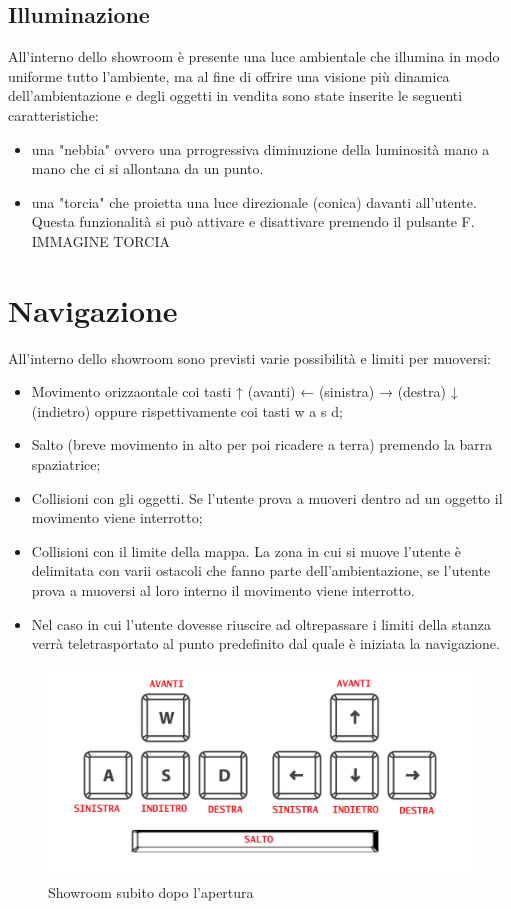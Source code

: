 \subsection{Illuminazione}
All'interno dello showroom è presente una luce ambientale che illumina in modo uniforme tutto l'ambiente, ma al fine di offrire una visione più dinamica dell'ambientazione e degli oggetti in vendita sono state inserite le seguenti caratteristiche:
\begin{itemize}
	\item una "nebbia" ovvero una prrogressiva diminuzione della luminosità mano a mano che ci si allontana da un punto.
	\item una "torcia" che proietta una luce direzionale (conica) davanti all'utente. Questa funzionalità si può attivare e disattivare premendo il pulsante F.
IMMAGINE TORCIA
\end{itemize}


\section{Navigazione}
All'interno dello showroom sono previsti varie possibilità e limiti per muoversi:
\begin{itemize}
	\item Movimento orizzaontale coi tasti ↑ (avanti) ← (sinistra) → (destra) ↓ (indietro) oppure rispettivamente coi tasti w a s d;
	\item Salto (breve movimento in alto per poi ricadere a terra) premendo la barra spaziatrice;
	\item Collisioni con gli oggetti. Se l'utente prova a muoveri dentro ad un oggetto il movimento viene interrotto;
	\item Collisioni con il limite della mappa. La zona in cui si muove l'utente è delimitata con varii ostacoli che fanno parte dell'ambientazione, se l'utente prova a muoversi al loro interno il movimento viene interrotto. 
	\item Nel caso in cui l'utente dovesse riuscire ad oltrepassare i limiti della stanza verrà teletrasportato al punto predefinito dal quale è iniziata la navigazione.
\end{itemize}
\begin{figure}[H]
  \renewcommand{\thefigure}{2}
  \includegraphics[width=\linewidth]{./res/images/comandi_direzionali.png}
  \caption{Showroom subito dopo l'apertura}
  \label{Showroom subito dopo l'apertura}
\end{figure}

